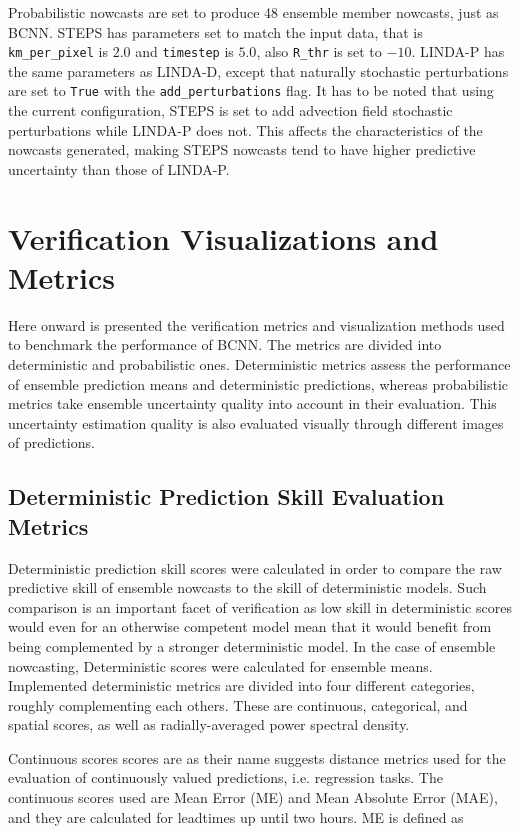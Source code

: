 Probabilistic nowcasts are set to produce 48 ensemble member nowcasts, just as BCNN. STEPS has parameters set to match the input data, that is \texttt{km\_per\_pixel} is $2.0$ and \texttt{timestep} is $5.0$, also \texttt{R\_thr} is set to $-10$. LINDA-P has the same parameters as LINDA-D, except that naturally stochastic perturbations are set to \texttt{True} with the \texttt{add\_perturbations} flag. It has to be noted that using the current configuration, STEPS is set to add advection field stochastic perturbations while LINDA-P does not. This affects the characteristics of the nowcasts generated, making STEPS nowcasts tend to have higher predictive uncertainty than those of LINDA-P.

\section{Verification Visualizations and Metrics}

Here onward is presented the verification metrics and visualization methods used to benchmark the performance of BCNN. The metrics are divided into deterministic and probabilistic ones. Deterministic metrics assess the performance of ensemble prediction means and deterministic predictions, whereas probabilistic metrics take ensemble uncertainty quality into account in their evaluation. This uncertainty estimation quality is also evaluated visually through different images of predictions.

\subsection{Deterministic Prediction Skill Evaluation Metrics}
\label{section:det_metric}

Deterministic prediction skill scores were calculated in order to compare the raw predictive skill of ensemble nowcasts to the skill of deterministic models. Such comparison is an important facet of verification as low skill in deterministic scores would even for an otherwise competent model mean that it would benefit from being complemented by a stronger deterministic model. In the case of ensemble nowcasting, Deterministic scores were calculated for ensemble means. Implemented deterministic metrics are divided into four different categories, roughly complementing each others. These are continuous, categorical, and spatial scores, as well as radially-averaged power spectral density.  

Continuous scores scores are as their name suggests distance metrics used for the evaluation of continuously valued predictions, i.e. regression tasks. The continuous scores used are Mean Error (ME) and Mean Absolute Error (MAE), and they are calculated for leadtimes up until two hours. ME is defined as 

